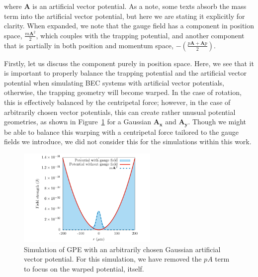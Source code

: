 \noindent where $\mathbf{A}$ is an artificial vector potential.
As a note, some texts absorb the mass term into the artificial vector potential, but here we are stating it explicitly for clarity.
When expanded, we note that the gauge field has a component in position space, $\frac{m\mathbf{A}^2}{2}$, which couples with the trapping potential, and another component that is partially in both position and momentum space, $-\left(\frac{p\mathbf{A} + \mathbf{A}p}{2}\right)$.

Firstly, let us discuss the component purely in position space.
Here, we see that it is important to properly balance the trapping potential and the artificial vector potential when simulating BEC systems with artificial vector potentials, otherwise, the trapping geometry will become warped.
In the case of rotation, this is effectively balanced by the centripetal force; however, 
in the case of arbitrarily chosen vector potentials, this can create rather unusual potential geometries, as shown in Figure~\ref{fig:V_change} for a Gaussian $\mathbf{A_x}$ and $\mathbf{A_y}$.
Though we might be able to balance this warping with a centripetal force tailored to the gauge fields we introduce, we did not consider this for the simulations within this work.

\begin{figure}

\center \includegraphics[width=0.6\textwidth]{data/splitop/gauge/check.pdf}

\caption{
Simulation of GPE with an arbitrarily chosen Gaussian artificial vector potential.
For this simulation, we have removed the $pA$ term to focus on the warped potential, itself.}
\label{fig:V_change}
\end{figure}

